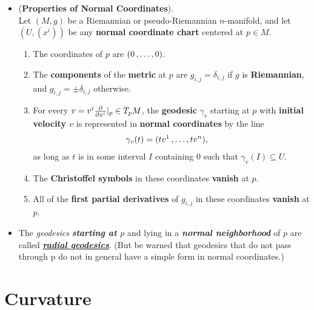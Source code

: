 \documentclass[11pt]{article}
\begin{document}
\begin{itemize}
\item \begin{proposition} (\textbf{Properties of Normal Coordinates}). \citep{lee2018introduction} \\
Let $(M, g)$ be a Riemannian or pseudo-Riemannian $n$-manifold, and let $(U, (x^i))$ be any \textbf{normal coordinate chart} centered at $p \in M$.
\begin{enumerate}
\item The coordinates of $p$ are $(0 \,{,}\ldots{,}\, 0)$.
\item The \textbf{components} of the \textbf{metric} at $p$ are $g_{i,j} = \delta_{i,j}$ if $g$ is \textbf{Riemannian}, and $g_{i,j} = \pm \delta_{i,j}$ otherwise.
\item For every $v = v^i \frac{\partial }{ \partial x^i}|_{p} \in T_{p}M$, the \textbf{geodesic} $\gamma_v$ starting at $p$ with \textbf{initial velocity $v$} is represented in \textbf{normal coordinates} by the line
\begin{align}
\gamma_{v}(t) &= (tv^1 \,{,}\ldots{,}\, tv^n), \label{eqn: normal_coordinate_geodesic}
\end{align} as long as $t$ is in some interval $I$ containing $0$ such that $\gamma_v(I) \subseteq U$.
\item The \textbf{Christoffel symbols} in these coordinates \textbf{vanish} at $p$.
\item All of the \textbf{first partial derivatives} of $g_{i,j}$ in these coordinates \textbf{vanish} at $p$.
\end{enumerate}
\end{proposition}

\item \begin{remark}
The \emph{geodesics} \emph{\textbf{starting at $p$}} and lying in a \emph{\textbf{normal neighborhood}} of $p$ are called \underline{\emph{\textbf{radial geodesics}}}. (But be warned that geodesics that do not pass through p do not in general have a simple form in normal coordinates.)
\end{remark}
\end{itemize}

\section{Curvature}
\end{document}
